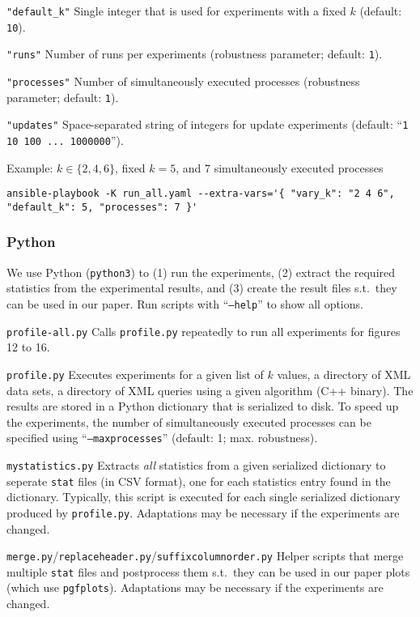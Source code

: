 \documentclass[a4, 10pt]{article}
\newenvironment{packed_descr}{
\begin{description}
  \setlength{\itemsep}{1pt}
  \setlength{\parskip}{0pt}
  \setlength{\parsep}{0pt}
}{\end{description}}
\begin{document}
\begin{packed_descr}
\begin{packed_descr}
    \item[\texttt{"default\_k"}] Single integer that is used for experiments with a fixed $k$ (default: \texttt{10}).
    \item[\texttt{"runs"}] Number of runs per experiments (robustness parameter; default: \texttt{1}).
    \item[\texttt{"processes"}] Number of simultaneously executed processes (robustness parameter; default: \texttt{1}).
    \item[\texttt{"updates"}] Space-separated string of integers for update experiments (default: ``\texttt{1 10 100 ...\ 1000000}'').
  \end{packed_descr}
  Example: $k \in \{ 2, 4, 6 \}$, fixed $k = 5$, and 7 simultaneously executed processes
\begin{lstlisting}[style=custombash]
ansible-playbook -K run_all.yaml --extra-vars='{ "vary_k": "2 4 6", "default_k": 5, "processes": 7 }'
\end{lstlisting}
\end{packed_descr}

\subsubsection{Python}

We use Python (\texttt{python3}) to (1) run the experiments, (2) extract the required statistics from the experimental results, and (3) create the result files s.t.\ they can be used in our paper. Run scripts with ``\texttt{--help}'' to show all options.

\begin{packed_descr}
  \item[\texttt{profile-all.py}] Calls \texttt{profile.py} repeatedly to run all experiments for figures 12 to 16.
  \item[\texttt{profile.py}] Executes experiments for a given list of $k$ values, a directory of XML data sets, a directory of XML queries using a given algorithm (C++ binary). The results are stored in a Python dictionary that is serialized to disk. To speed up the experiments, the number of simultaneously executed processes can be specified using ``\texttt{--maxprocesses}'' (default: 1; max. robustness).
  \item[\texttt{mystatistics.py}] Extracts \emph{all} statistics from a given serialized dictionary to seperate \texttt{stat} files (in CSV format), one for each statistics entry found in the dictionary. Typically, this script is executed for each single serialized dictionary produced by \texttt{profile.py}. Adaptations may be necessary if the experiments are changed.
  \item[\texttt{merge.py}/\texttt{replaceheader.py}/\texttt{suffixcolumnorder.py}] Helper scripts that merge multiple \texttt{stat} files and postprocess them s.t.\ they can be used in our paper plots (which use \texttt{pgfplots}). Adaptations may be necessary if the experiments are changed.
\end{packed_descr}
\end{document}
